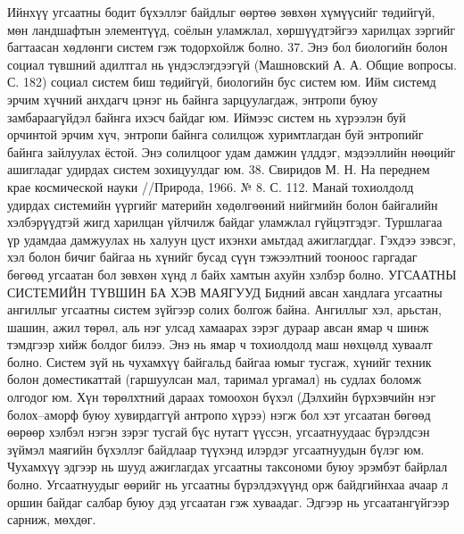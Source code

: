 Ийнхүү угсаатны бодит бүхэллэг байдлыг өөртөө зөвхөн хүмүүсийг төдийгүй, мөн ландшафтын элементүүд, соёлын уламжлал, хөршүүдтэйгээ харилцах зэргийг багтаасан хөдлөнги систем гэж тодорхойлж болно. 37. Энэ бол биологийн болон социал түвшний адилтгал нь үндэслэгдээгүй (Машновский А. А. Общие вопросы. С. 182) социал систем биш төдийгүй, биологийн бус систем юм.
Ийм системд эрчим хүчний анхдагч цэнэг нь байнга зарцуулагдаж, энтропи буюу замбараагүйдэл байнга ихэсч байдаг юм. Иймээс систем нь хүрээлэн буй орчинтой эрчим хүч, энтропи байнга солилцож хуримтлагдан буй энтропийг байнга зайлуулах ёстой. Энэ солилцоог удам дамжин үлддэг, мэдээллийн нөөцийг ашигладаг удирдах систем зохицуулдаг юм. 38. Свиридов М. Н. На переднем крае космической науки //Природа, 1966. № 8. С. 112.
Манай тохиолдолд удирдах системийн үүргийг материйн хөдөлгөөний нийгмийн болон байгалийн хэлбэрүүдтэй жигд харилцан үйлчилж байдаг уламжлал гүйцэтгэдэг. Туршлагаа үр удамдаа дамжуулах нь халуун цуст ихэнхи амьтдад ажиглагддаг. Гэхдээ зэвсэг, хэл болон бичиг байгаа нь хүнийг бусад сүүн тэжээлтний тооноос гаргадаг бөгөөд угсаатан бол зөвхөн хүнд л байх хамтын ахуйн хэлбэр болно.
УГСААТНЫ СИСТЕМИЙН ТҮВШИН БА ХЭВ МАЯГУУД
Бидний авсан хандлага угсаатны ангиллыг угсаатны систем зүйгээр солих болгож байна. Ангиллыг хэл, арьстан, шашин, ажил төрөл, аль нэг улсад хамаарах зэрэг дураар авсан ямар ч шинж тэмдгээр хийж болдог билээ. Энэ нь ямар ч тохиолдолд маш нөхцөлд хуваалт болно. Систем зүй нь чухамхүү байгальд байгаа юмыг тусгаж, хүнийг техник болон доместикаттай (гаршуулсан мал, таримал ургамал) нь судлах боломж олгодог юм. Хүн төрөлхтний дараах томоохон бүхэл (Дэлхийн бүрхэвчийн нэг болох–аморф буюу хувирдаггүй антропо хүрээ) нэгж бол хэт угсаатан бөгөөд өөрөөр хэлбэл нэгэн зэрэг тусгай бүс нутагт үүссэн, угсаатнуудаас бүрэлдсэн зүймэл маягийн бүхэллэг байдлаар түүхэнд илэрдэг угсаатнуудын бүлэг юм. Чухамхүү эдгээр нь шууд ажиглагдах угсаатны таксономи буюу эрэмбэт байрлал болно. Угсаатнуудыг өөрийг нь угсаатны бүрэлдэхүүнд орж байдгийнхаа ачаар л оршин байдаг салбар буюу дэд угсаатан гэж хуваадаг. Эдгээр нь угсаатангүйгээр сарниж, мөхдөг.
